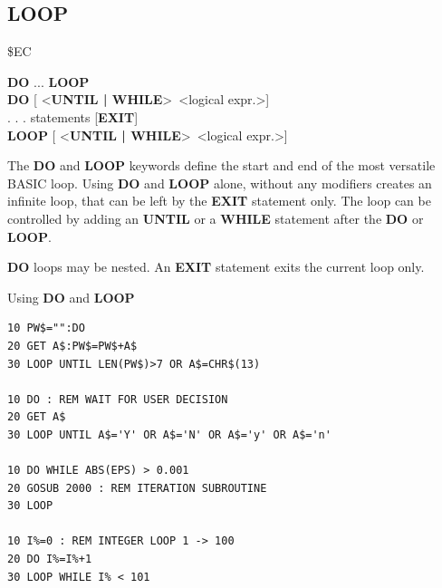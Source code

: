 \subsection{LOOP}
\begin{description}[leftmargin=2cm,style=nextline]
\item [Token:] \$EC
\item [Format:] {\bf DO} ... {\bf LOOP} \\
                {\bf DO} [ <{\bf UNTIL | WHILE}> <logical expr.>] \\
                . . . statements [{\bf EXIT}] \\
                {\bf LOOP} [ <{\bf UNTIL | WHILE}> <logical expr.>]
\item [Usage:] The {\bf DO} and {\bf LOOP} keywords define
               the start and end of the most versatile BASIC loop.
               Using {\bf DO} and {\bf LOOP} alone, without any
               modifiers creates an infinite loop, that can be left
               by the {\bf EXIT} statement only. The loop can be
               controlled by adding an {\bf UNTIL} or a {\bf WHILE}
               statement after the {\bf DO} or {\bf LOOP}.

\item [Remarks:] {\bf DO} loops may be nested. An {\bf EXIT} statement
               exits the current loop only.
\item [Example:] Using {\bf DO} and {\bf LOOP}
\begin{tcolorbox}[colback=black,coltext=white]
\verbatimfont{\codefont}
\begin{verbatim}
10 PW$="":DO
20 GET A$:PW$=PW$+A$
30 LOOP UNTIL LEN(PW$)>7 OR A$=CHR$(13)

10 DO : REM WAIT FOR USER DECISION
20 GET A$
30 LOOP UNTIL A$='Y' OR A$='N' OR A$='y' OR A$='n'

10 DO WHILE ABS(EPS) > 0.001
20 GOSUB 2000 : REM ITERATION SUBROUTINE
30 LOOP

10 I%=0 : REM INTEGER LOOP 1 -> 100
20 DO I%=I%+1
30 LOOP WHILE I% < 101
\end{verbatim}
\end{tcolorbox}
\end{description}


\newpage
